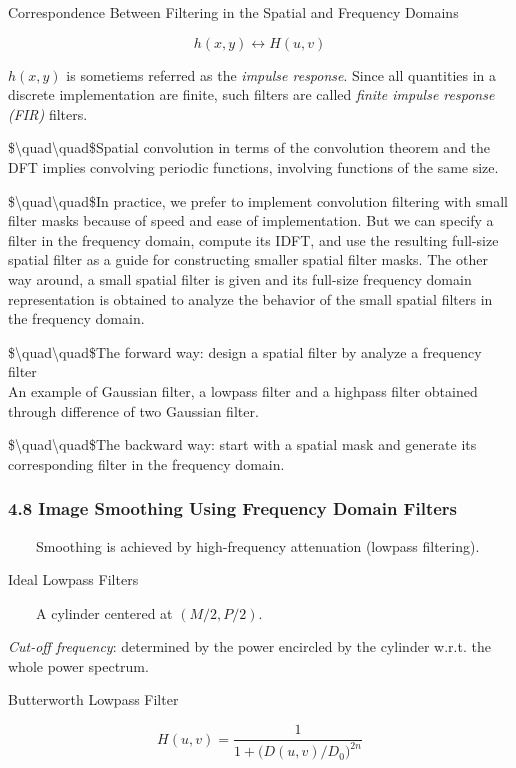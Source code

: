 \documentclass[]{article}
\begin{document}
Correspondence Between Filtering in the Spatial and Frequency Domains

\[h(x,y)\leftrightarrow H(u,v)\]

\(h(x,y)\) is sometiems referred as the \emph{impulse response}. Since
all quantities in a discrete implementation are finite, such filters are
called \emph{finite impulse response (FIR)} filters.

\$\textbackslash{}quad\textbackslash{}quad\$Spatial convolution in terms
of the convolution theorem and the DFT implies convolving periodic
functions, involving functions of the same size.

\$\textbackslash{}quad\textbackslash{}quad\$In practice, we prefer to
implement convolution filtering with small filter masks because of speed
and ease of implementation. But we can specify a filter in the frequency
domain, compute its IDFT, and use the resulting full-size spatial filter
as a guide for constructing smaller spatial filter masks. The other way
around, a small spatial filter is given and its full-size frequency
domain representation is obtained to analyze the behavior of the small
spatial filters in the frequency domain.

\$\textbackslash{}quad\textbackslash{}quad\$The forward way: design a
spatial filter by analyze a frequency filter\\
 An example of Gaussian filter, a lowpass filter and a highpass filter
obtained through difference of two Gaussian filter.

\$\textbackslash{}quad\textbackslash{}quad\$The backward way: start with
a spatial mask and generate its corresponding filter in the frequency
domain.

\subsubsection{4.8 Image Smoothing Using Frequency Domain
Filters}\label{header-n556}

\(\quad\quad\)Smoothing is achieved by high-frequency attenuation
(lowpass filtering).

Ideal Lowpass Filters

\(\quad\quad\)A cylinder centered at \((M/2,P/2)\).

\emph{Cut-off frequency}: determined by the power encircled by the
cylinder w.r.t. the whole power spectrum.

Butterworth Lowpass Filter

\[H(u,v)=\dfrac{1}{1+\big(D(u,v)/D_0\big)^{2n}}\]
\end{document}
